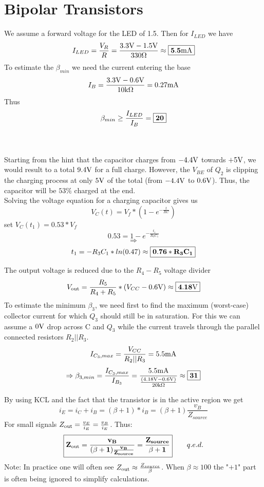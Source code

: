 \documentclass[../main.tex]{subfiles}
\begin{document}
\section{Bipolar Transistors}

	We assume a forward voltage for the LED of 1.5\V. Then for $I_{LED}$ we have
	\[I_{LED} = \frac{V_R}{R} = \frac{3.3\text{V} - 1.5\text{V}}{330\Omega} \approx \boxed{\mathbf{5.5\text{m}\text{A}}}\]
	To estimate the $\beta_{min}$ we need the current entering the base
	\[I_B = \frac{3.3\text{V} - 0.6\text{V}}{10\text{k}\Omega} = 0.27\text{m}\text{A} \]
	Thus
	\[\beta_{min} \geq \frac{I_{LED}}{I_B} = \boxed{\mathbf{20}}\]
	
	
	\\\\
	Starting from the hint that the capacitor charges from $-4.4\text{V}$ towards $+5\text{V}$, we would result to a total $9.4\text{V}$ for a full charge. However, the $V_{BE}$ of $Q_2$ is clipping the charging process at only $5\text{V}$ of the total (from $-4.4\text{V}$ to $0.6\text{V}$). Thus, the capacitor will be $53\%$ charged at the end. \\Solving the voltage equation for a charging capacitor gives us
	\[V_C(t) = V_f * (1 - e^{-\frac{t}{R C}})\]
	set $V_C(t_1) = 0.53 * V_f$
	\[0.53 = 1 - e^{-\frac{t_1}{R_3 C_1}}\]
	\[\Rightarrow\]
	\[t_1 = - R_3 C_1*ln(0.47) \approx \boxed{\mathbf{0.76 * R_3 C_1}}\]
	
	
	The output voltage is reduced due to the $R_4 - R_5$ voltage divider
	\[V_{\text{out}} = \frac{R_5}{R_4 + R_5} * (V_{CC} - 0.6\text{V}) \approx \boxed{\mathbf{4.18\text{V}}}\]
	To estimate the minimum $\beta_3$, we need first to find the maximum (worst-case) collector current for which $Q_3$ should still be in saturation. For this we can assume a $0\text{V}$ drop across C and $Q_3$ while the current travels through the parallel connected resistors $R_2||R_3$.
	\[I_{C_3,max} = \frac{V_{CC}}{R_2||R_3} = 5.5\text{m}\text{A}\]
	\[\Rightarrow \beta_{3,min} = \frac{I_{C_3,max}}{I_{B_3}} = \frac{5.5\text{m}\text{A}}{\frac{(4.18\text{V} - 0.6\text{V})} {20\text{k}\Omega}} \approx \boxed{\mathbf{31}}\]
	
	
	By using KCL and the fact that the transistor is in the active region we get
	\[i_E = i_C + i_B = (\beta + 1) * i_B = (\beta + 1) \frac{v_B}{Z_{source}}\]
	For small signals $Z_{\text{out}} = \frac{v_E}{i_E} = \frac{v_B}{i_E}$. Thus:
	\[ \boxed{\mathbf{Z_{\text{out}} = \frac{v_B}{(\beta + 1)\frac{v_B}{Z_{source}}} = \frac{Z_{source}}{\beta +1}}}\qquad q.e.d.\]
	Note: In practice one will often see $Z_{\text{out}} \approx \frac{Z_{source}}{\beta}$. When $\beta \approx 100$ the "$+ 1$" part is often being ignored to simplify calculations.
\end{document}
